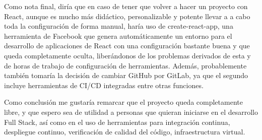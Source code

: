 Como nota final, diría que en caso de tener que volver a hacer un proyecto con React, aunque es mucho más didáctico, personalizable y potente llevar a a cabo toda la configuración de forma manual, haría uso de create-react-app, una herramienta de Facebook que genera automáticamente un entorno para el desarrollo de aplicaciones de React con una configuración bastante buena y que queda completamente oculta, liberándonos de los problemas derivados de esta y de horas de trabajo de configuración de herramientas. Además, probablemente también tomaría la decisión de cambiar GitHub por GitLab, ya que el segundo incluye herramientas de CI/CD integradas entre otras funciones.

Como conclusión me gustaría remarcar que el proyecto queda completamente libre, y que espero sea de utilidad a personas que quieran iniciarse en el desarrollo \gls{Full Stack}, así como en el uso de herramientas para integración continua, despliegue continuo, verificación de calidad del código, infraestructura virtual.
